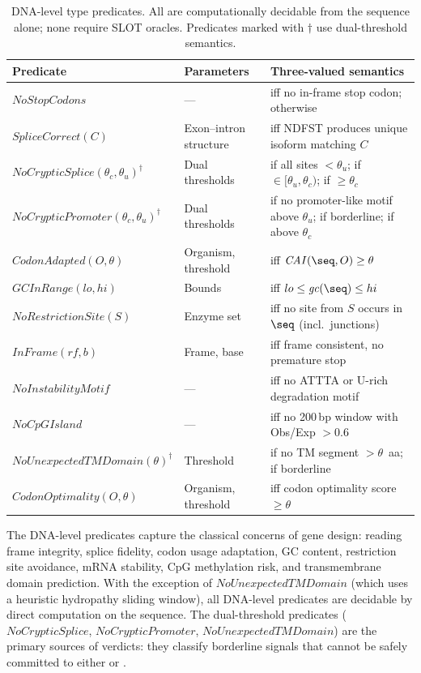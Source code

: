 \begin{table}[t]
\centering
\caption{DNA-level type predicates. All are computationally decidable
         from the sequence alone; none require SLOT oracles.
         Predicates marked with $\dagger$ use dual-threshold
         semantics.}
\label{tab:dna-predicates}
\begin{tabular}{llp{4.6cm}}
\toprule
\textbf{Predicate} & \textbf{Parameters} & \textbf{Three-valued semantics} \\
\midrule
$\mathit{NoStopCodons}$ & --- &
  \PASS{} iff no in-frame stop codon; \FAIL{} otherwise \\
$\mathit{SpliceCorrect}(C)$ & Exon--intron structure &
  \PASS{} iff NDFST produces unique isoform matching $C$ \\
$\mathit{NoCrypticSplice}(\theta_c,\theta_u)^\dagger$ & Dual thresholds &
  \PASS{} if all sites $< \theta_u$; \UNCERTAIN{} if $\in
  [\theta_u, \theta_c)$; \FAIL{} if $\ge \theta_c$ \\
$\mathit{NoCrypticPromoter}(\theta_c,\theta_u)^\dagger$ & Dual thresholds &
  \PASS{} if no promoter-like motif above $\theta_u$; \UNCERTAIN{}
  if borderline; \FAIL{} if above $\theta_c$ \\
$\mathit{CodonAdapted}(O,\theta)$ & Organism, threshold &
  \PASS{} iff $\mathit{CAI}(\seq, O) \ge \theta$ \\
$\mathit{GCInRange}(lo,hi)$ & Bounds &
  \PASS{} iff $lo \le \mathit{gc}(\seq) \le hi$ \\
$\mathit{NoRestrictionSite}(S)$ & Enzyme set &
  \PASS{} iff no site from $S$ occurs in $\seq$ (incl.\ junctions) \\
$\mathit{InFrame}(rf,b)$ & Frame, base &
  \PASS{} iff frame consistent, no premature stop \\
$\mathit{NoInstabilityMotif}$ & --- &
  \PASS{} iff no ATTTA or U-rich degradation motif \\
$\mathit{NoCpGIsland}$ & --- &
  \PASS{} iff no 200\,bp window with Obs/Exp $> 0.6$ \\
$\mathit{NoUnexpectedTMDomain}(\theta)^\dagger$ & Threshold &
  \PASS{} if no TM segment $> \theta$~aa; \UNCERTAIN{} if
  borderline \\
$\mathit{CodonOptimality}(O,\theta)$ & Organism, threshold &
  \PASS{} iff codon optimality score $\ge \theta$ \\
\bottomrule
\end{tabular}
\end{table}

\noindent The DNA-level predicates capture the classical concerns of
gene design: reading frame integrity, splice fidelity, codon usage
adaptation, GC content, restriction site avoidance, mRNA stability,
CpG methylation risk, and transmembrane domain prediction.
With the exception of $\mathit{NoUnexpectedTMDomain}$ (which uses a
heuristic hydropathy sliding window), all DNA-level predicates are
decidable by direct computation on the sequence.
The dual-threshold predicates ($\mathit{NoCrypticSplice}$,
$\mathit{NoCrypticPromoter}$, $\mathit{NoUnexpectedTMDomain}$) are
the primary sources of \UNCERTAIN{} verdicts: they classify borderline
signals that cannot be safely committed to either \PASS{} or \FAIL{}.

